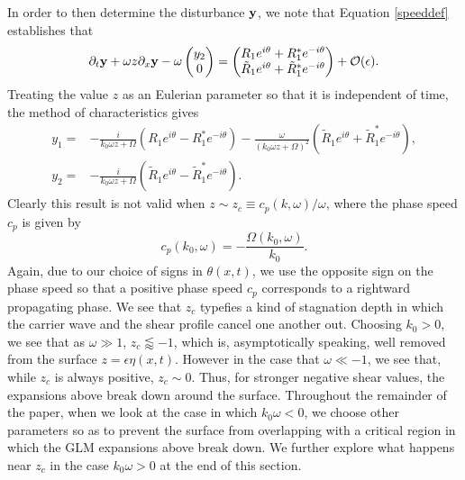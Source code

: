 \documentclass{JFM_Style/jfm}
\newcommand{\bp}{\begin{pmatrix}}
\newcommand{\ep}{\end{pmatrix}}
\newcommand{\pd}{\partial}
\begin{document}
In order to then determine the disturbance ${\bf y}$, we note that Equation \eqref{speeddef} establishes that
\begin{equation}
\pd_{t}{\bf y} + \omega z \pd_{x}{\bf y} - \omega \bp y_{2}\\ 0 \ep = \bp R_{1}e^{i\theta}+R^{\ast}_{1}e^{-i\theta}\\ \tilde{R}_{1}e^{i\theta}+\tilde{R}^{\ast}_{1}e^{-i\theta} \ep + \mathcal{O}(\epsilon).
\label{vareqn}
\end{equation}
Treating the value $z$ as an Eulerian parameter so that it is independent of time, the method of characteristics gives 
\begin{align*}
y_{1} = & - \frac{i}{k_{0}\omega z + \Omega}\left(R_{1}e^{i\theta} -R^{\ast}_{1}e^{-i\theta} \right) - \frac{\omega}{(k_{0}\omega z + \Omega)^{2}}\left(\tilde{R}_{1}e^{i\theta} + \tilde{R}^{\ast}_{1}e^{-i\theta} \right),\\
y_{2} = & - \frac{i}{k_{0}\omega z + \Omega}\left(\tilde{R}_{1}e^{i\theta} -\tilde{R}^{\ast}_{1}e^{-i\theta} \right).
\end{align*}
Clearly this result is not valid when $z\sim z_{c} \equiv c_{p}(k,\omega)/\omega$, where the phase speed $c_{p}$ is given by 
\[
c_{p}(k_{0},\omega) = -\frac{\Omega(k_{0},\omega)}{k_{0}}.
\]
Again, due to our choice of signs in $\theta(x,t)$, we use the opposite sign on the phase speed so that a positive phase speed $c_{p}$ corresponds to a rightward propagating phase.   We see that $z_{c}$ typefies a kind of stagnation depth in which the carrier wave and the shear profile cancel one another out.  Choosing $k_{0}>0$, we see that as $\omega \gg 1$, $z_{c}\lessapprox -1$, which is, asymptotically speaking, well removed from the surface $z=\epsilon \eta(x,t)$.  However in the case that $\omega \ll -1$, we see that, while $z_{c}$ is always positive, $z_{c}\sim 0$.  Thus, for stronger negative shear values, the expansions above break down around the surface.    Throughout the remainder of the paper, when we look at the case in which $k_{0}\omega <0$, we choose other parameters so as to prevent the surface from overlapping with a critical region in which the GLM expansions above break down. We further explore what happens near $z_{c}$ in the case $k_{0}\omega >0$ at the end of this section.  
\end{document}
